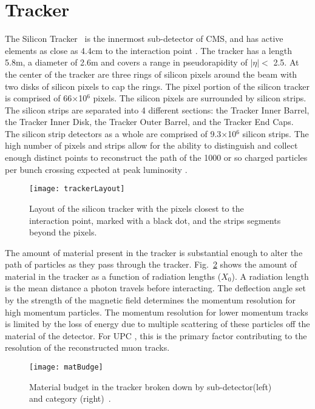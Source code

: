   \section{Tracker}
    The Silicon Tracker~\cite{CMS:2000aa} is the innermost sub-detector of CMS, and has active
    	elements as close as 4.4cm to the interaction point \cite{tCmsE}. 
    The tracker has a length 5.8m, a diameter of 2.6m and
    	covers a range in pseudorapidity of $|\eta| <$ 2.5.
    At the center of the tracker are three rings of silicon pixels around the beam 
    	with two disks of silicon pixels to cap the rings.
    The pixel portion of the silicon tracker is comprised of 66$\times$10$^{6}$
    	pixels.
    The silicon pixels are surrounded by silicon strips.
    The silicon strips are separated into 4 different sections: 
    	the Tracker Inner Barrel, the Tracker Inner Disk, the Tracker Outer 
    	Barrel, and the Tracker End Caps.
    The silicon strip detectors as a whole are comprised of 9.3$\times$10$^{6}$ silicon 
    	strips.
    The high number of pixels and strips allow for the ability to distinguish
    	and collect enough distinct points to reconstruct the path of the 1000
    	or so charged particles per bunch crossing expected at peak luminosity
    	\cite{tCmsE}.
    \begin{figure}[!Hhbt]
      \centering
      \texttt{[image: trackerLayout]}
      \caption{Layout of the silicon tracker with the pixels closest to the 
        interaction point, marked with a black dot, and the strips segments 
        beyond the pixels.}
      \label{fig:fig:trackerLayout}
    \end{figure}

    The amount of material present in the tracker is substantial enough to
      alter the path of particles as they pass through the tracker. 
    Fig.~\ref{fig:matBudge} shows the amount of material in the tracker 
      as a function of radiation lengths ($X_{0}$).
    A radiation length is the mean distance a photon travels before 
      interacting. 
    The deflection angle set by the strength of the magnetic 
      field determines the momentum resolution for high momentum particles. 
    The momentum resolution for lower momentum tracks is limited by 
      the loss of energy due to multiple scattering of these particles off the 
      material of the detector.
    For UPC \JPsi{}, this is the primary factor contributing to the resolution 
      of the reconstructed muon tracks. 
    \begin{figure}[!Hhbt]
      \centering
      \texttt{[image: matBudge]}
      \caption{Material budget in the tracker broken down by sub-detector(left) and
        category (right)~\cite{tCmsE}.}
      \label{fig:matBudge}
    \end{figure}

